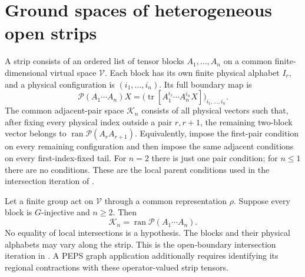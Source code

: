 \section{Ground spaces of heterogeneous open strips}%
\label{sec:peps_g_injective_strip_parent_ground_space}

\begin{definition}%
    \label{def:peps_g_injective_strip_parent_space}
    \leanok
    A strip consists of an ordered list of tensor blocks
    $A_1,\ldots,A_n$ on a common finite-dimensional virtual space
    $\mathcal V$. Each block has its own finite physical alphabet
    $I_r$, and a physical configuration is $(i_1,\ldots,i_n)$.
    Its full boundary map is
    \[
        \mathcal P(A_1\cdots A_n)X
        =\bigl(\operatorname{tr}
        [A_1^{i_1}\cdots A_n^{i_n}X]\bigr)_{i_1,\ldots,i_n}.
    \]
    The common adjacent-pair space $\mathcal K_n$ consists of all
    physical vectors such that, after fixing every physical index
    outside a pair $r,r+1$, the remaining two-block vector belongs
    to $\operatorname{ran}\mathcal P(A_rA_{r+1})$.
    Equivalently, impose the first-pair condition on every remaining
    configuration and then impose the same adjacent conditions on
    every first-index-fixed tail. For $n=2$ there is just one pair
    condition; for $n\le1$ there are no conditions.
    These are the local parent conditions used in the
    intersection iteration of \cite[Theorem~4.11]{Schuch2010PEPS}.
\end{definition}

\begin{lemma}%
    \label{thm:peps_g_injective_strip_parent_space}
    \leanok
    Let a finite group act on $\mathcal V$ through a common
    representation $\rho$. Suppose every block is $G$-injective
    and $n\ge2$. Then
    \[
        \mathcal K_n=\operatorname{ran}\mathcal P(A_1\cdots A_n).
    \]
    No equality of local intersections is a hypothesis. The blocks
    and their physical alphabets may vary along the strip.
    This is the open-boundary intersection iteration in
    \cite[Theorems~4.11 and~5.4]{Schuch2010PEPS}. A PEPS graph
    application additionally requires identifying its regional
    contractions with these operator-valued strip tensors.
\end{lemma}


